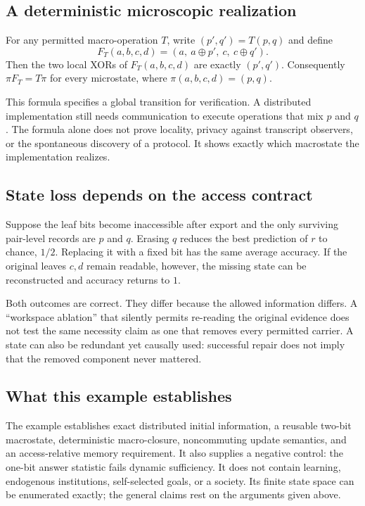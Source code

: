 \documentclass[11pt,oneside,openany]{book}
\numberwithin{equation}{section}
\begin{document}
\subsection{A deterministic microscopic realization}
For any permitted macro-operation $T$, write $(p',q')=T(p,q)$ and define
\[
F_T(a,b,c,d)=(a,\ a\oplus p',\ c,\ c\oplus q').
\]
Then the two local XORs of $F_T(a,b,c,d)$ are exactly $(p',q')$. Consequently $\pi F_T=T\pi$ for every microstate, where $\pi(a,b,c,d)=(p,q)$.

This formula specifies a global transition for verification. A distributed implementation still needs communication to execute operations that mix $p$ and $q$. The formula alone does not prove locality, privacy against transcript observers, or the spontaneous discovery of a protocol. It shows exactly which macrostate the implementation realizes.

\subsection{State loss depends on the access contract}
Suppose the leaf bits become inaccessible after export and the only surviving pair-level records are $p$ and $q$. Erasing $q$ reduces the best prediction of $r$ to chance, $1/2$. Replacing it with a fixed bit has the same average accuracy. If the original leaves $c,d$ remain readable, however, the missing state can be reconstructed and accuracy returns to $1$.

Both outcomes are correct. They differ because the allowed information differs. A ``workspace ablation'' that silently permits re-reading the original evidence does not test the same necessity claim as one that removes every permitted carrier. A state can also be redundant yet causally used: successful repair does not imply that the removed component never mattered.

\subsection{What this example establishes}
The example establishes exact distributed initial information, a reusable two-bit macrostate, deterministic macro-closure, noncommuting update semantics, and an access-relative memory requirement. It also supplies a negative control: the one-bit answer statistic fails dynamic sufficiency. It does not contain learning, endogenous institutions, self-selected goals, or a society. Its finite state space can be enumerated exactly; the general claims rest on the arguments given above.
\end{document}
